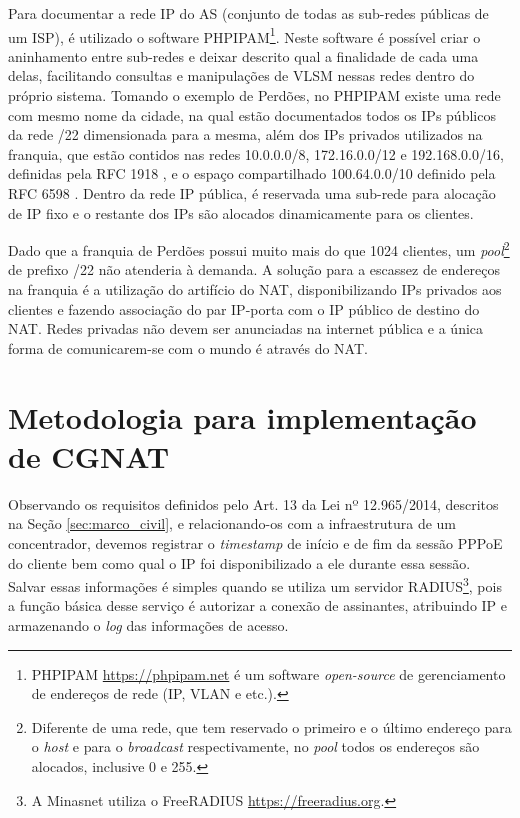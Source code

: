    Para documentar a rede IP do AS (conjunto de todas as sub-redes públicas de um ISP), é utilizado o software PHPIPAM\footnote{PHPIPAM \url{https://phpipam.net} é um software \textit{open-source} de gerenciamento de endereços de rede (IP, VLAN e etc.).}. Neste software é possível criar o aninhamento entre sub-redes e deixar descrito qual a finalidade de cada uma delas, facilitando consultas e manipulações de VLSM nessas redes dentro do próprio sistema. Tomando o exemplo de Perdões, no PHPIPAM existe uma rede com mesmo nome da cidade, na qual estão documentados todos os IPs públicos da rede /22 dimensionada para a mesma, além dos IPs privados utilizados na franquia, que estão contidos nas redes 10.0.0.0/8, 172.16.0.0/12 e 192.168.0.0/16, definidas pela RFC 1918 \cite{rfc1918}, e o espaço compartilhado 100.64.0.0/10 definido pela RFC 6598 \cite{rfc6598}. Dentro da rede IP pública, é reservada uma sub-rede para alocação de IP fixo e o restante dos IPs são alocados dinamicamente para os clientes.
   
   Dado que a franquia de Perdões possui muito mais do que 1024 clientes, um \textit{pool}\footnote{Diferente de uma rede, que tem reservado o primeiro e o último endereço para o \textit{host} e para o \textit{broadcast} respectivamente, no \textit{pool} todos os endereços são alocados, inclusive 0 e 255.} de prefixo /22 não atenderia à demanda. A solução para a escassez de endereços na franquia é a utilização do artifício do NAT, disponibilizando IPs privados aos clientes e fazendo associação do par IP-porta com o IP público de destino do NAT. Redes privadas não devem ser anunciadas na internet pública e a única forma de comunicarem-se com o mundo é através do NAT. 
   
\section{Metodologia para implementação de CGNAT}

   Observando os requisitos definidos pelo Art. 13 da Lei nº 12.965/2014, descritos na Seção \ref{sec:marco_civil}, e relacionando-os com a infraestrutura de um concentrador, devemos registrar o \textit{timestamp} de início e de fim da sessão PPPoE do cliente bem como qual o IP foi disponibilizado a ele durante essa sessão. Salvar essas informações é simples quando se utiliza um servidor RADIUS\footnote{A Minasnet utiliza o FreeRADIUS \url{https://freeradius.org}.}, pois a função básica desse serviço é autorizar a conexão de assinantes, atribuindo IP e armazenando o \textit{log} das informações de acesso.


